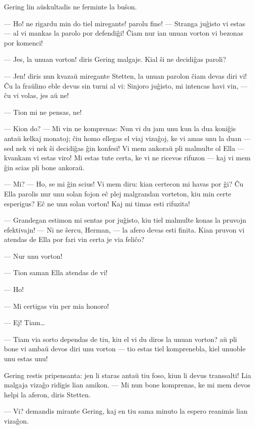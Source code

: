    Gering lin a\u uskultadis ne ferminte la bu\^son.

 --- Ho! ne rigardu min do tiel miregante! parolu fine! --- Stranga
ju\^gisto vi estas --- al vi mankas la parolo por defendi\^gi!
\^Ciam nur ian unuan vorton vi bezonas por komenci!

 --- Jes, la unuan vorton! diris Gering malgaje. Kial \^si ne decidi\^gas
paroli?

 --- Jen! diris nun kvaza\u u miregante Stetten, la unuan parolon \^ciam
devas diri vi! \^Cu la fra\u ulino eble devus sin turni al vi:
Sinjoro ju\^gisto, mi intencas havi vin, --- \^cu vi volas, jes a\u
u ne!

 --- Tion mi ne pensas, ne!

 --- Kion do? --- Mi vin ne komprenas: Nun vi du jam unu kun la dua
koni\^gis anta\u u kelkaj monatoj; \^ciu homo ellegas el viaj
viza\^goj, ke vi amas unu la duan --- sed nek vi nek \^si
decidi\^gas \^gin konfesi! Vi mem ankora\u u pli malmulte ol Ella
--- kvankam vi estas viro! Mi estas tute certa, ke vi ne ricevos
rifuzon --- kaj vi mem \^gin scias pli bone ankora\u u.

 --- Mi? --- Ho, se mi \^gin scius! Vi mem diru: kian certecon mi havas
por \^gi? \^Cu Ella parolis nur unu solan fojon e\^c plej malgrandan
vorteton, kiu min certe esperigus? E\^c ne unu solan vorton! Kaj mi
timas esti rifuzita!

 --- Grandegan estimon mi sentas por ju\^gisto, kiu tiel malmulte konas
la pruvojn efektivajn! --- Ni ne \^sercu, Herman, --- la afero devas
esti finita. Kian pruvon vi atendas de Ella por fari vin certa je
via feli\^co?

 --- Nur unu vorton!

 --- Tion saman Ella atendas de vi!

 --- Ho!

 --- Mi certigas vin per mia honoro!

 --- Ej! Tiam\dots

 --- Tiam via sorto dependas de tiu, kiu el vi du diros la unuan
vorton? a\u u pli bone vi amba\u u devos diri unu vorton --- tio
estas tiel komprenebla, kiel unuoble unu estas unu!

   Gering restis pripensanta: jen li staras anta\u u tiu foso, kiun li
devus transsalti! Lia malgaja viza\^go ridigis lian amikon. --- Mi
nun bone komprenas, ke mi mem devos helpi la aferon, diris Stetten.

 --- Vi? demandis mirante Gering, kaj en tiu sama minuto la espero
reanimis lian viza\^gon.

